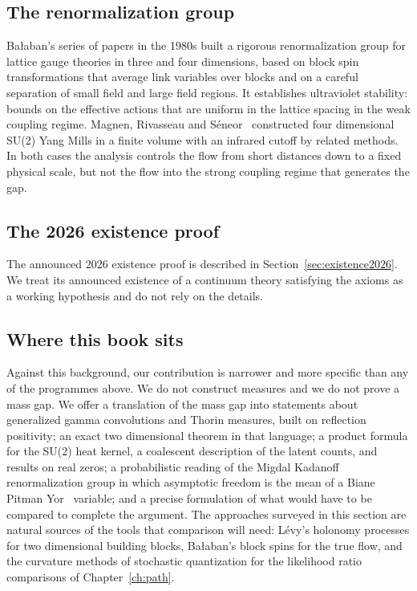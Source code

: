 \subsection{The renormalization group}

Ba\l aban's series of papers in the 1980s built a rigorous renormalization group for lattice gauge theories in three and four dimensions, based on block spin transformations that average link variables over blocks and on a careful separation of small field and large field regions. It establishes ultraviolet stability: bounds on the effective actions that are uniform in the lattice spacing in the weak coupling regime. Magnen, Rivasseau and S\'eneor~\cite{MRS} constructed four dimensional SU(2) Yang Mills in a finite volume with an infrared cutoff by related methods. In both cases the analysis controls the flow from short distances down to a fixed physical scale, but not the flow into the strong coupling regime that generates the gap.

\subsection{The 2026 existence proof}

The announced 2026 existence proof is described in Section~\ref{sec:existence2026}. We treat its announced existence of a continuum theory satisfying the axioms as a working hypothesis and do not rely on the details.

\subsection{Where this book sits}

Against this background, our contribution is narrower and more specific than any of the programmes above. We do not construct measures and we do not prove a mass gap. We offer a translation of the mass gap into statements about generalized gamma convolutions and Thorin measures, built on reflection positivity; an exact two dimensional theorem in that language; a product formula for the SU(2) heat kernel, a coalescent description of the latent counts, and results on real zeros; a probabilistic reading of the Migdal Kadanoff renormalization group in which asymptotic freedom is the mean of a Biane Pitman Yor~\cite{BPY} variable; and a precise formulation of what would have to be compared to complete the argument. The approaches surveyed in this section are natural sources of the tools that comparison will need: L\'evy's holonomy processes for two dimensional building blocks, Ba\l aban's block spins for the true flow, and the curvature methods of stochastic quantization for the likelihood ratio comparisons of Chapter~\ref{ch:path}.
